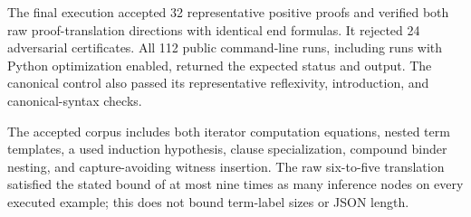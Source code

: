 The final execution accepted 32 representative positive proofs and verified both raw proof-translation directions with identical end formulas. It rejected 24 adversarial certificates. All 112 public command-line runs, including runs with Python optimization enabled, returned the expected status and output. The canonical control also passed its representative reflexivity, introduction, and canonical-syntax checks.

The accepted corpus includes both iterator computation equations, nested term templates, a used induction hypothesis, clause specialization, compound binder nesting, and capture-avoiding witness insertion. The raw six-to-five translation satisfied the stated bound of at most nine times as many inference nodes on every executed example; this does not bound term-label sizes or JSON length.
